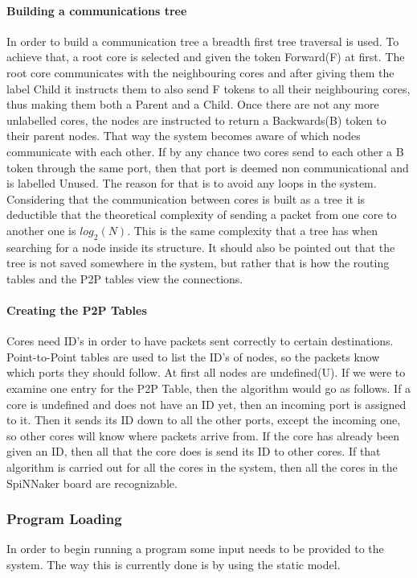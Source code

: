 \documentclass[12pt,twosided]{article}
\begin{document}
\paragraph{Building a communications tree}
In order to build a communication tree a breadth first tree traversal is used. To achieve that, a root core is selected and given the token Forward(F) at first. The root core communicates with the neighbouring cores and after giving them the label Child it instructs them to also send F tokens to all their neighbouring cores, thus making them both a Parent and a Child. Once there are not any more unlabelled cores, the nodes are instructed to return a Backwards(B) token to their parent nodes. That way the system becomes aware of which nodes communicate with each other. If by any chance two cores send to each other a B token through the same port, then that port is deemed non communicational and is labelled Unused. The reason for that is to avoid any loops in the system\cite{jefflec}. Considering that the communication between cores is built as a tree it is deductible that the theoretical complexity of sending a packet from one core to another one is $log_2(N)$. This is the same complexity that a tree has when searching for a node inside its structure. It should also be pointed out that the tree is not saved somewhere in the system, but rather that is how the routing tables and the P2P tables view the connections.
\paragraph{Creating the P2P Tables}
Cores need ID's in order to have packets sent correctly to certain destinations. Point-to-Point tables are used to list the ID's of nodes, so the packets know which ports they should follow. At first all nodes are undefined(U). If we were to examine one entry for the P2P Table, then the algorithm would go as follows. If a core is undefined and does not have an ID yet, then an incoming port is assigned to it. Then it sends its ID down to all the other ports, except the incoming one, so other cores will know where packets arrive from. If the core has already been given an ID, then all that the core does is send its ID to other cores. If that algorithm is carried out for all the cores in the system, then all the cores in the SpiNNaker board are recognizable\cite{jefflec}.

\subsubsection{Program Loading}
In order to begin running a program some input needs to be provided to the system. The way this is currently done is by using the static model. 
\end{document}
